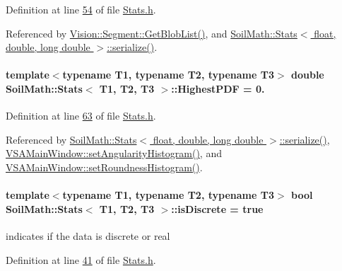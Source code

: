 Definition at line \hyperlink{_stats_8h_source_l00054}{54} of file \hyperlink{_stats_8h_source}{Stats.\+h}.



Referenced by \hyperlink{_segment_8cpp_source_l00534}{Vision\+::\+Segment\+::\+Get\+Blob\+List()}, and \hyperlink{_stats_8h_source_l00651}{Soil\+Math\+::\+Stats$<$ float, double, long double $>$\+::serialize()}.

\hypertarget{class_soil_math_1_1_stats_a85da0692f7d25c9d5add1f8ffd67bdf2}{}
\paragraph[{Highest\+P\+D\+F}]{\setlength{\rightskip}{0pt plus 5cm}template$<$typename T1, typename T2, typename T3$>$ double {\bf Soil\+Math\+::\+Stats}$<$ T1, T2, T3 $>$\+::Highest\+P\+D\+F = 0.}\label{class_soil_math_1_1_stats_a85da0692f7d25c9d5add1f8ffd67bdf2}


Definition at line \hyperlink{_stats_8h_source_l00063}{63} of file \hyperlink{_stats_8h_source}{Stats.\+h}.



Referenced by \hyperlink{_stats_8h_source_l00651}{Soil\+Math\+::\+Stats$<$ float, double, long double $>$\+::serialize()}, \hyperlink{vsamainwindow_8cpp_source_l00315}{V\+S\+A\+Main\+Window\+::set\+Angularity\+Histogram()}, and \hyperlink{vsamainwindow_8cpp_source_l00291}{V\+S\+A\+Main\+Window\+::set\+Roundness\+Histogram()}.

\hypertarget{class_soil_math_1_1_stats_a2f54bbc8d815345b23ebbd4ba2b302bf}{}
\paragraph[{is\+Discrete}]{\setlength{\rightskip}{0pt plus 5cm}template$<$typename T1, typename T2, typename T3$>$ bool {\bf Soil\+Math\+::\+Stats}$<$ T1, T2, T3 $>$\+::is\+Discrete = true}\label{class_soil_math_1_1_stats_a2f54bbc8d815345b23ebbd4ba2b302bf}
indicates if the data is discrete or real 

Definition at line \hyperlink{_stats_8h_source_l00041}{41} of file \hyperlink{_stats_8h_source}{Stats.\+h}.



